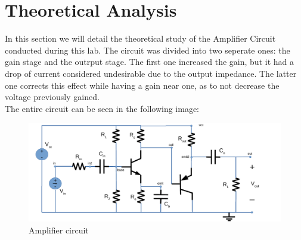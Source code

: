 \section{Theoretical Analysis}
\label{sec:analysis}

In this section we will detail the theoretical study of the Amplifier Circuit conducted during this lab. The circuit was divided into two seperate ones: the gain stage and the outrput stage. The first one increased the gain, but it had a drop of current considered undesirable due to the output impedance. The latter one corrects this effect while having a gain near one, as to not decrease the voltage previously gained.\\
The entire circuit can be seen in the following image:\\


\begin{figure} [!htb] 
  \includegraphics[width=\linewidth]{circuit.pdf}
  \caption{Amplifier circuit}
  \label{fig:theoplots}
  \endminipage\hfill
\end{figure}



